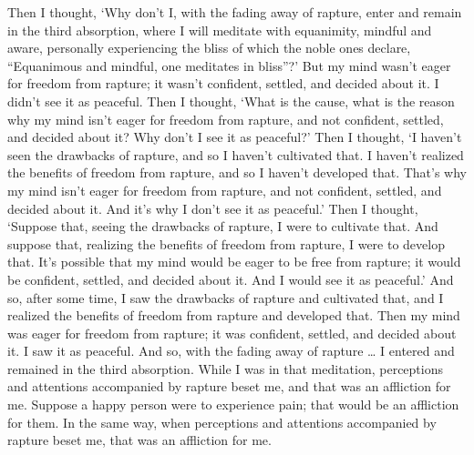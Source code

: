 \documentclass[12pt,openany]{book}%
\begin{document}
Then I thought, ‘Why don’t I, with the fading away of rapture, enter and remain in the third absorption, where I will meditate with equanimity, mindful and aware, personally experiencing the bliss of which the noble ones declare, “Equanimous and mindful, one meditates in bliss”?’ But my mind wasn’t eager for freedom from rapture; it wasn’t confident, settled, and decided about it. I didn’t see it as peaceful. Then I thought, ‘What is the cause, what is the reason why my mind isn’t eager for freedom from rapture, and not confident, settled, and decided about it? Why don’t I see it as peaceful?’ Then I thought, ‘I haven’t seen the drawbacks of rapture, and so I haven’t cultivated that. I haven’t realized the benefits of freedom from rapture, and so I haven’t developed that. That’s why my mind isn’t eager for freedom from rapture, and not confident, settled, and decided about it. And it’s why I don’t see it as peaceful.’ Then I thought, ‘Suppose that, seeing the drawbacks of rapture, I were to cultivate that. And suppose that, realizing the benefits of freedom from rapture, I were to develop that. It’s possible that my mind would be eager to be free from rapture; it would be confident, settled, and decided about it. And I would see it as peaceful.’ And so, after some time, I saw the drawbacks of rapture and cultivated that, and I realized the benefits of freedom from rapture and developed that. Then my mind was eager for freedom from rapture; it was confident, settled, and decided about it. I saw it as peaceful. And so, with the fading away of rapture … I entered and remained in the third absorption. While I was in that meditation, perceptions and attentions accompanied by rapture beset me, and that was an affliction for me. Suppose a happy person were to experience pain; that would be an affliction for them. In the same way, when perceptions and attentions accompanied by rapture beset me, that was an affliction for me. 
\end{document}
